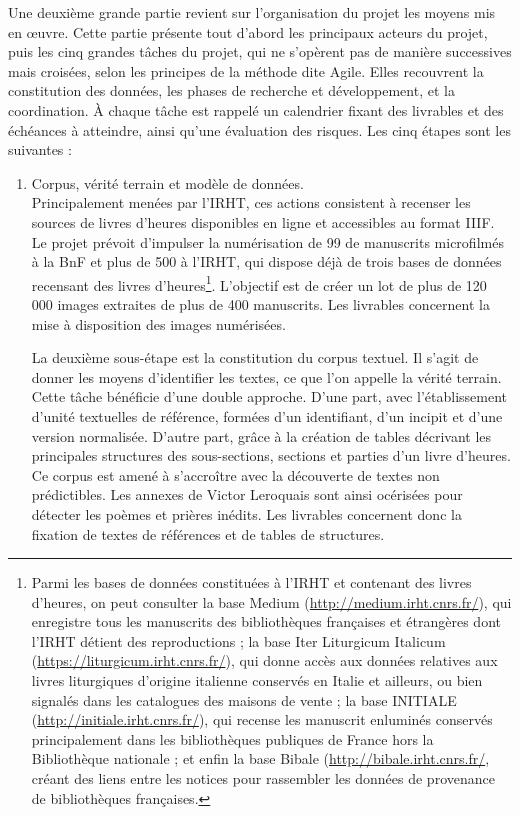 \documentclass[a4paper,12pt,twoside]{book}
\begin{document}
	Une deuxième grande partie revient sur l'organisation du projet les moyens mis en œuvre. Cette partie présente tout d'abord les principaux acteurs du projet, puis les cinq grandes tâches du projet, qui ne s'opèrent pas de manière successives mais croisées, selon les principes de la méthode dite \og Agile\fg{}. Elles recouvrent la constitution des données, les phases de recherche et développement, et la coordination.  À chaque tâche est rappelé un calendrier fixant des livrables et des échéances à atteindre, ainsi qu'une évaluation des risques. Les cinq étapes sont les suivantes : 
	\begin{enumerate}
	    \item \og Corpus, vérité terrain et modèle de données\fg{}. \\
	    
	    Principalement menées par l'IRHT, ces actions consistent à recenser les sources de livres d'heures disponibles en ligne et accessibles au format IIIF. Le projet prévoit d'impulser la numérisation de 99 de manuscrits microfilmés à la BnF et plus de 500 à l'IRHT, qui dispose déjà de trois bases de données recensant des livres d'heures\footnote{Parmi les bases de données constituées à l'IRHT et contenant des livres d'heures, on peut consulter la base Medium (\url{http://medium.irht.cnrs.fr/}), qui enregistre tous les manuscrits des bibliothèques françaises et étrangères dont l’IRHT détient des reproductions ; la base Iter Liturgicum Italicum (\url{https://liturgicum.irht.cnrs.fr/}), qui donne accès aux données relatives aux livres liturgiques d’origine italienne conservés en Italie et ailleurs, ou bien signalés dans les catalogues des maisons de vente ; la base INITIALE (\url{http://initiale.irht.cnrs.fr/}), qui recense les manuscrit enluminés conservés principalement dans les bibliothèques publiques de France hors la Bibliothèque nationale ; et enfin la base Bibale (\url{http://bibale.irht.cnrs.fr/}, créant des liens entre les notices pour rassembler les données de provenance de bibliothèques françaises.}. L'objectif est de créer un lot de plus de 120 000 images extraites de plus de 400 manuscrits. Les livrables concernent la mise à disposition des images numérisées.
	    
	    La deuxième sous-étape est la constitution du corpus textuel. Il s'agit de donner les moyens d'identifier les textes, ce que l'on appelle la \og vérité terrain\fg{}. Cette tâche bénéficie d'une double approche. D'une part, avec l'établissement d'unité textuelles de référence, formées d'un identifiant, d'un incipit et d'une version normalisée. D'autre part, grâce à la création de tables décrivant les principales structures des sous-sections, sections et parties d'un livre d'heures. Ce corpus est amené à s'accroître  avec la découverte de textes non prédictibles. Les  annexes de Victor Leroquais sont ainsi océrisées pour détecter les poèmes et prières inédits. Les livrables concernent donc la fixation de textes de références et de tables de structures. 
	    

\end{enumerate}
\end{document}
